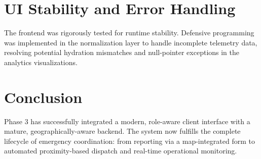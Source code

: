 \documentclass[12pt,a4paper]{report}
\begin{document}
\section{UI Stability and Error Handling}

The frontend was rigorously tested for runtime stability. Defensive programming was implemented in the normalization layer to handle incomplete telemetry data, resolving potential hydration mismatches and null-pointer exceptions in the analytics visualizations.

\section{Conclusion}

Phase 3 has successfully integrated a modern, role-aware client interface with a mature, geographically-aware backend. The system now fulfills the complete lifecycle of emergency coordination: from reporting via a map-integrated form to automated proximity-based dispatch and real-time operational monitoring.
\end{document}
